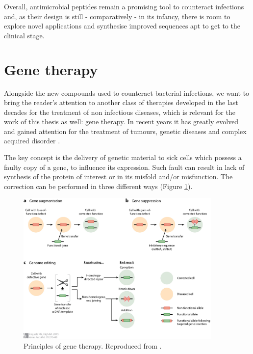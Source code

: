 Overall, antimicrobial peptides remain a promising tool to counteract infections and, as their design is still - comparatively - in its infancy, there is room to explore novel applications and synthesise improved sequences apt to get to the clinical stage.


\section{Gene therapy} \label{sec:gene_th}
Alongside the new compounds used to counteract bacterial infections, we want to bring the reader's attention to another class of therapies developed in the last decades for the treatment of non infectious diseases, which is relevant for the work of this thesis as well: gene therapy. In recent years it has greatly evolved and gained attention for the treatment of tumours, genetic diseases and complex acquired disorder \cite{Anguela2019}.

The key concept is the delivery of genetic material to sick cells which possess a faulty copy of a gene, to influence its expression. Such fault can result in lack of synthesis of the protein of interest or in its misfold and/or misfunction. The correction can be performed in three different ways (Figure \ref{fig:gene_therapy}).

\begin{figure}
\begin{center}
\includegraphics[width = 0.9\textwidth]{1introduction/pics/gene_therapy.jpeg}
\caption[Principles of gene therapy]{Principles of gene therapy. Reproduced from \cite{Anguela2019}.} \label{fig:gene_therapy}
\end{center}
\end{figure}

